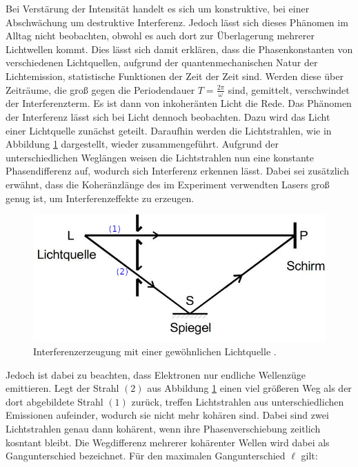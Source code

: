 Bei Verstärung der Intensität handelt es sich um konstruktive, bei einer Abschwächung um destruktive Interferenz.
Jedoch lässt sich dieses Phänomen im Alltag nicht beobachten, obwohl es auch dort zur Überlagerung mehrerer Lichtwellen kommt. \newline
Dies lässt sich damit erklären, dass die Phasenkonstanten von verschiedenen Lichtquellen, aufgrund der quantenmechanischen Natur der Lichtemission,
statistische Funktionen der Zeit der Zeit sind.
Werden diese über Zeiträume, die groß gegen die Periodendauer $T=\frac{2\pi}{\omega} $ sind, gemittelt, verschwindet der Interferenzterm.
Es ist dann von inkoheränten Licht die Rede.\newline
Das Phänomen der Interferenz lässt sich bei Licht dennoch beobachten.
Dazu wird das Licht einer Lichtquelle zunächst geteilt. Daraufhin werden die Lichtstrahlen, wie in Abbildung \ref{fig:koh} dargestellt, wieder zusammengeführt.
Aufgrund der unterschiedlichen Weglängen weisen die Lichtstrahlen nun eine konstante Phasendifferenz auf, wodurch sich Interferenz erkennen lässt.
Dabei sei zusätzlich erwähnt, dass die Koheränzlänge des im Experiment verwendten Lasers groß genug ist, um Interferenzeffekte zu erzeugen.
\begin{figure}[H]
  \centering
  \includegraphics[scale=1.45]{Text/Bilder/kohaerenz.jpg}
  \caption{Interferenzerzeugung mit einer gewöhnlichen Lichtquelle \cite[]{sample}.}
  \label{fig:koh}
\end{figure}
Jedoch ist dabei zu beachten, dass Elektronen nur endliche Wellenzüge emittieren. Legt der Strahl $(2)$ aus Abbildung \ref{fig:koh} einen
viel größeren Weg als der dort abgebildete Strahl $(1)$ zurück, treffen Lichtstrahlen aus unterschiedlichen Emissionen aufeinder, wodurch sie nicht mehr kohären sind.
Dabei sind zwei Lichtstrahlen genau dann kohärent, wenn ihre Phasenverschiebung zeitlich kosntant bleibt.
Die Wegdifferenz mehrerer kohärenter Wellen wird dabei als Gangunterschied bezeichnet.
Für den maximalen Gangunterschied $\ell$ gilt:
